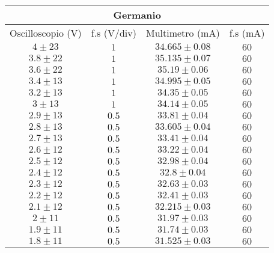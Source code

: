 \documentclass[../main.tex]{subfiles}
\begin{document}
    \begin{tabular}{ ||c|c|c|c|| }
        \hline
        \multicolumn{4}{||c||}{Germanio} \\
        \hline
        Oscilloscopio (V) & f.s (V/div) & Multimetro (mA)  & f.s (mA) \\
        \hline
        $4\pm 23$         & $1$         & $34.665\pm 0.08$ & $60$     \\
        \hline
        $3.8\pm 22$       & $1$         & $35.135\pm 0.07$ & $60$     \\
        \hline
        $3.6\pm 22$       & $1$         & $35.19\pm 0.06$  & $60$     \\
        \hline
        $3.4\pm 13$       & $1$         & $34.995\pm 0.05$ & $60$     \\
        \hline
        $3.2\pm 13$       & $1$         & $34.35\pm 0.05$  & $60$     \\
        \hline
        $3\pm 13$         & $1$         & $34.14\pm 0.05$  & $60$     \\
        \hline
        $2.9\pm 13$       & $0.5$       & $33.81\pm 0.04$  & $60$     \\
        \hline
        $2.8\pm 13$       & $0.5$       & $33.605\pm 0.04$ & $60$     \\
        \hline
        $2.7\pm 13$       & $0.5$       & $33.41\pm 0.04$  & $60$     \\
        \hline
        $2.6\pm 12$       & $0.5$       & $33.22\pm 0.04$  & $60$     \\
        \hline
        $2.5\pm 12$       & $0.5$       & $32.98\pm 0.04$  & $60$     \\
        \hline
        $2.4\pm 12$       & $0.5$       & $32.8\pm 0.04$   & $60$     \\
        \hline
        $2.3\pm 12$       & $0.5$       & $32.63\pm 0.03$  & $60$     \\
        \hline
        $2.2\pm 12$       & $0.5$       & $32.41\pm 0.03$  & $60$     \\
        \hline
        $2.1\pm 12$       & $0.5$       & $32.215\pm 0.03$ & $60$     \\
        \hline
        $2\pm 11$         & $0.5$       & $31.97\pm 0.03$  & $60$     \\
        \hline
        $1.9\pm 11$       & $0.5$       & $31.74\pm 0.03$  & $60$     \\
        \hline
        $1.8\pm 11$       & $0.5$       & $31.525\pm 0.03$ & $60$     \\

\end{tabular}
\end{document}
